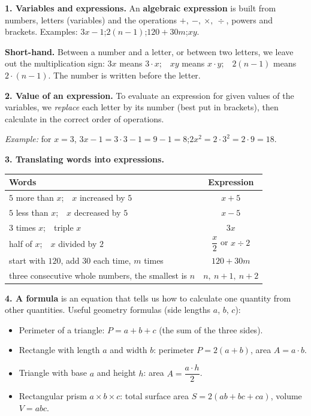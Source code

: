 \begin{knowbox}
\textbf{1. Variables and expressions.} An \textbf{algebraic expression} is built from numbers, letters
(variables) and the operations $+,\ -,\ \times,\ \div$, powers and brackets. Examples: $3x-1$;\quad $2(n-1)$;\quad $120+30m$;\quad $xy$.

\textbf{Short-hand.} Between a number and a letter, or between two letters, we leave out the multiplication sign:
$3x$ means $3\cdot x$;\ \ $xy$ means $x\cdot y$;\ \ $2(n-1)$ means $2\cdot(n-1)$. The number is written before the letter.

\textbf{2. Value of an expression.} To evaluate an expression for given values of the variables, we
\emph{replace} each letter by its number (best put in brackets), then calculate in the correct order of operations.

\emph{Example:} for $x=3$, $3x-1=3\cdot 3-1=9-1=8$;\quad $2x^2=2\cdot 3^2=2\cdot 9=18$.

\textbf{3. Translating words into expressions.}

\begin{center}
\begin{tabular}{|l|c|}
\hline
\rowcolor{tmBlue!10}\textbf{Words} & \textbf{Expression}\\ \hline
$5$ more than $x$;\ \ $x$ increased by $5$ & $x+5$\\ \hline
$5$ less than $x$;\ \ $x$ decreased by $5$ & $x-5$\\ \hline
$3$ times $x$;\ \ triple $x$ & $3x$\\ \hline
half of $x$;\ \ $x$ divided by $2$ & $\dfrac{x}{2}$ or $x\div 2$\\ \hline
start with $120$, add $30$ each time, $m$ times & $120+30m$\\ \hline
three consecutive whole numbers, the smallest is $n$ & $n,\ n+1,\ n+2$\\ \hline
\end{tabular}
\end{center}

\textbf{4. A formula} is an equation that tells us how to calculate one quantity from other quantities.
Useful geometry formulas (side lengths $a$, $b$, $c$):
\begin{itemize}[leftmargin=1.4em,itemsep=1pt,topsep=2pt]
\item Perimeter of a triangle: $P=a+b+c$ (the sum of the three sides).
\item Rectangle with length $a$ and width $b$: perimeter $P=2(a+b)$, area $A=a\cdot b$.
\item Triangle with base $a$ and height $h$: area $A=\dfrac{a\cdot h}{2}$.
\item Rectangular prism $a\times b\times c$: total surface area $S=2(ab+bc+ca)$, volume $V=abc$.
\end{itemize}
\end{knowbox}

